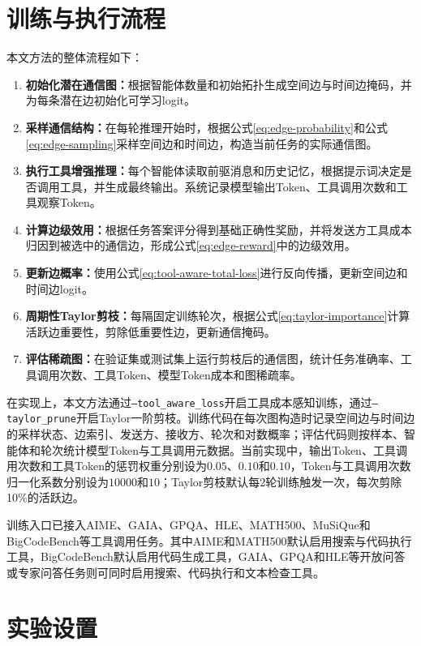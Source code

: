 \section{训练与执行流程}

本文方法的整体流程如下：

\begin{enumerate}[topsep=0pt,itemsep=0pt,parsep=0pt,partopsep=0pt,leftmargin=0em,itemindent=2em,label=\arabic*.]
  \item \textbf{初始化潜在通信图：}根据智能体数量和初始拓扑生成空间边与时间边掩码，并为每条潜在边初始化可学习logit。
  \item \textbf{采样通信结构：}在每轮推理开始时，根据公式\ref{eq:edge-probability}和公式\ref{eq:edge-sampling}采样空间边和时间边，构造当前任务的实际通信图。
  \item \textbf{执行工具增强推理：}每个智能体读取前驱消息和历史记忆，根据提示词决定是否调用工具，并生成最终输出。系统记录模型输出Token、工具调用次数和工具观察Token。
  \item \textbf{计算边级效用：}根据任务答案评分得到基础正确性奖励，并将发送方工具成本归因到被选中的通信边，形成公式\ref{eq:edge-reward}中的边级效用。
  \item \textbf{更新边概率：}使用公式\ref{eq:tool-aware-total-loss}进行反向传播，更新空间边和时间边logit。
  \item \textbf{周期性Taylor剪枝：}每隔固定训练轮次，根据公式\ref{eq:taylor-importance}计算活跃边重要性，剪除低重要性边，更新通信掩码。
  \item \textbf{评估稀疏图：}在验证集或测试集上运行剪枝后的通信图，统计任务准确率、工具调用次数、工具Token、模型Token成本和图稀疏率。
\end{enumerate}

在实现上，本文方法通过\texttt{--tool\_aware\_loss}开启工具成本感知训练，通过\texttt{--taylor\_prune}开启Taylor一阶剪枝。训练代码在每次图构造时记录空间边与时间边的采样状态、边索引、发送方、接收方、轮次和对数概率；评估代码则按样本、智能体和轮次统计模型Token与工具调用元数据。当前实现中，输出Token、工具调用次数和工具Token的惩罚权重分别设为$0.05$、$0.10$和$0.10$，Token与工具调用次数归一化系数分别设为$10000$和$10$；Taylor剪枝默认每2轮训练触发一次，每次剪除10\%的活跃边。

训练入口已接入AIME、GAIA、GPQA、HLE、MATH500、MuSiQue和BigCodeBench等工具调用任务。其中AIME和MATH500默认启用搜索与代码执行工具，BigCodeBench默认启用代码生成工具，GAIA、GPQA和HLE等开放问答或专家问答任务则可同时启用搜索、代码执行和文本检查工具。

\section{实验设置}

